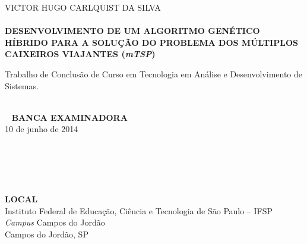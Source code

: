 \documentclass{abnt}
\begin{document}

	\capa
	
	\folhaderosto
	
	\begin{folhadeaprovacao}
	
	\setlength{\ABNTsignthickness}{1pt}
	\begin{center} 
		VICTOR HUGO CARLQUIST DA SILVA \\~\\
		\large{\textbf{DESENVOLVIMENTO DE UM ALGORITMO GENÉTICO HÍBRIDO PARA A SOLUÇÃO DO PROBLEMA DOS MÚLTIPLOS CAIXEIROS VIAJANTES (\textit{mTSP})}}
	\end{center}
	Trabalho de Conclusão de Curso em Tecnologia em Análise e Desenvolvimento de Sistemas.
	
	\begin{center}
		~\\~
		\textbf{BANCA EXAMINADORA}\\
		10 de junho de 2014\\
	\\
	\\
	\\~\\~\\
	
	\textbf{LOCAL}\\
	
	Instituto Federal de Educação, Ciência e Tecnologia de São Paulo -- IFSP\\ \textit{Campus} Campos do Jordão \\ Campos do Jordão, SP
	\end{center}
	\end{folhadeaprovacao}
	
	\sumario 

	
\end{document}
